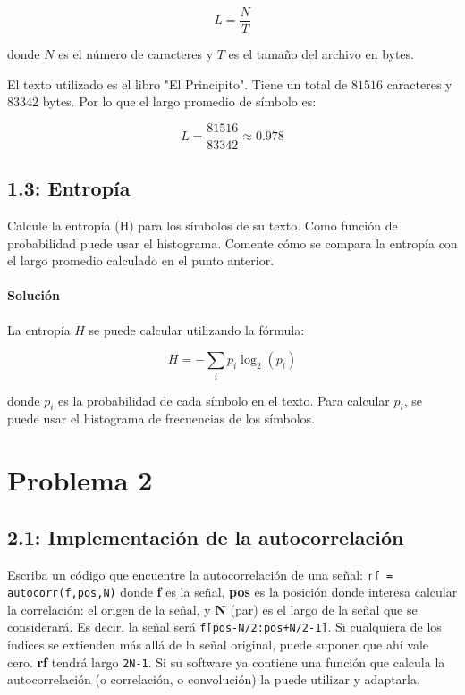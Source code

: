 \documentclass[11pt]{article}
\begin{document}
\[
L = \frac{N}{T}
\]

donde \( N \) es el número de caracteres y \( T \) es el tamaño del archivo en bytes.

El texto utilizado es el libro "El Principito". Tiene un total de $81516$ caracteres y $83342$ bytes. Por lo que el largo promedio de símbolo es:

\[
L = \frac{81516}{83342} \approx 0.978
\]



\subsection*{1.3: Entropía}

Calcule la entropía (H) para los símbolos de su texto. Como función de probabilidad puede usar el histograma. Comente cómo se compara la entropía con el largo promedio calculado en el punto anterior.

\paragraph{Solución}

La entropía \( H \) se puede calcular utilizando la fórmula:

\[
H = -\sum_{i} p_i \log_2(p_i)
\]

donde \( p_i \) es la probabilidad de cada símbolo en el texto. Para calcular \( p_i \), se puede usar el histograma de frecuencias de los símbolos.

\bigskip

\section*{Problema 2}

\subsection*{2.1: Implementación de la autocorrelación}

Escriba un código que encuentre la autocorrelación de una señal: \texttt{rf = autocorr(f,pos,N)} donde \textbf{f} es la señal, \textbf{pos} es la posición donde interesa calcular la correlación: el origen de la señal, y \textbf{N} (par) es el largo de la señal que se considerará. Es decir, la señal será \texttt{f[pos-N/2:pos+N/2-1]}. Si cualquiera de los índices se extienden más allá de la señal original, puede suponer que ahí vale cero. \textbf{rf} tendrá largo \texttt{2N-1}. Si su software ya contiene una función que calcula la autocorrelación (o correlación, o convolución) la puede utilizar y adaptarla.
\end{document}
